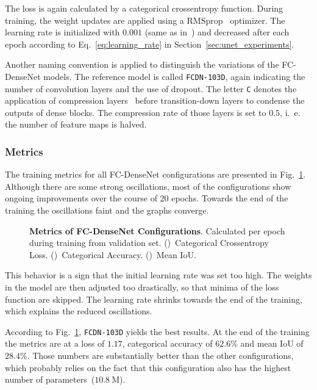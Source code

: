 The loss is again calculated by a categorical crossentropy function. During training, the weight updates are applied using a RMSprop~\cite{rmsprop14} optimizer. The learning rate is initialized with $0.001$ (same as in~\cite{denseseg17}) and decreased after each epoch according to Eq.~\ref{eq:learning_rate} in Section~\ref{sec:unet_experiments}.

Another naming convention is applied to distinguish the variations of the FC-DenseNet models. The reference model is called \texttt{FCDN-103D}, again indicating the number of convolution layers and the use of dropout. The letter \texttt{C} denotes the application of compression layers~\cite{denseseg17} before transition-down layers to condense the outputs of dense blocks. The compression rate of those layers is set to $0.5$, i.~e. the number of feature maps is halved.

\subsubsection{Metrics}
The training metrics for all FC-DenseNet configurations are presented in Fig.~\ref{fig:densenet_train_metrics}. Although there are some strong oscillations, most of the configurations show ongoing improvements over the course of 20 epochs. Towards the end of the training the oscillations faint and the graphs converge.

\begin{figure}[h]
    \newcommand{\DensenetMetricsImageWidth}{0.32\textwidth}
    \centering
            
    \caption[Metrics of FC-DenseNet Configurations]
    {\textbf{Metrics of FC-DenseNet Configurations}. Calculated per epoch during training from validation set. ()~Categorical Crossentropy Loss. ()~Categorical Accuracy. ()~Mean IoU.}
    \label{fig:densenet_train_metrics}
\end{figure}

This behavior is a sign that the initial learning rate was set too high. The weights in the model are then adjusted too drastically, so that minima of the loss function are skipped. The learning rate shrinks towards the end of the training, which explains the reduced oscillations.

According to Fig.~\ref{fig:densenet_train_metrics}, \texttt{FCDN-103D} yields the best results. At the end of the training the metrics are at a loss of $1.17$, categorical accuracy of $62.6\%$ and mean IoU of $28.4\%$. Those numbers are substantially better than the other configurations, which probably relies on the fact that this configuration also has the highest number of parameters~($10.8~\text{M}$).

